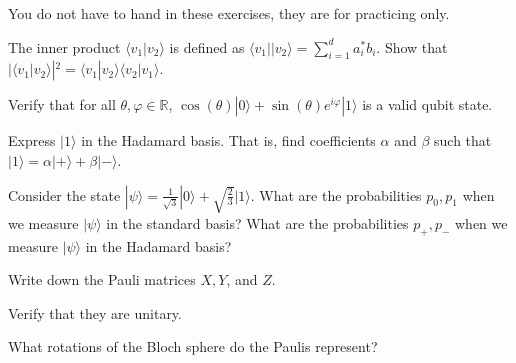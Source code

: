 \documentclass[a4paper,10pt,landscape,twocolumn]{scrartcl}
\newcommand{\ket}[1]{| #1 \rangle}
\begin{document}
\practiceproblems

{\sffamily\noindent
You do not have to hand in these exercises, they are for practicing only. %
}

\begin{exercise}
The inner product $\langle v_1 | v_2 \rangle$ is defined as $\langle v_1 || v_2 \rangle = \sum_{i=1}^d a^*_ib_i$. Show that $|\langle v_1 | v_2\rangle|^2 = \langle v_1 | v_2 \rangle\langle v_2 | v_1 \rangle$.
\end{exercise}

\begin{exercise}
Verify that for all $\theta, \varphi \in \mathbb{R}$, $\cos(\theta) \ket{0} + \sin(\theta)e^{i\varphi}\ket{1}$ is a valid qubit state.
\end{exercise}

\begin{exercise}
Express $\ket1$ in the Hadamard basis. That is, find coefficients $\alpha$ and $\beta$ such that $\ket1 = \alpha \ket+ + \beta \ket-$.
\end{exercise}

\begin{exercise}[Measurement]
Consider the state $\ket\psi = \frac{1}{\sqrt{3}}\ket0 + \sqrt{\frac{2}{3}}\ket1$. What are the probabilities $p_0, p_1$ when we measure $\ket\psi$ in the standard basis? What are the probabilities $p_+, p_-$ when we measure $\ket\psi$ in the Hadamard basis?
\end{exercise}

\begin{exercise}
\begin{subex}
Write down the Pauli matrices $X, Y$, and $Z$.
\end{subex}
\begin{subex}
Verify that they are unitary.
\end{subex}
\begin{subex}
What rotations of the Bloch sphere do the Paulis represent?
\end{subex}
\end{exercise}
\end{document}
